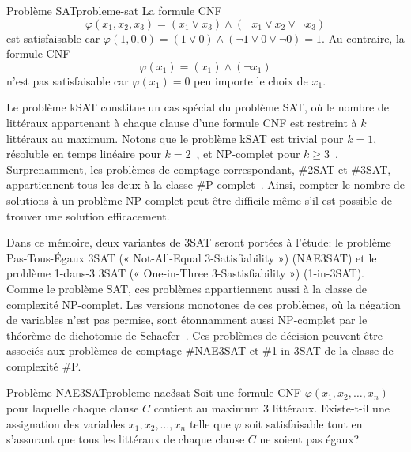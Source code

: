 \begin{example}{Problème SAT}{probleme-sat}
    La formule CNF
    \begin{equation*}
        \varphi(x_{1}, x_{2}, x_{3}) = (x_{1} \lor x_{3}) \land (\neg x_{1} \lor x_{2} \lor \neg x_{3}) 
    \end{equation*}
    est satisfaisable car $\varphi(1,0,0) = (1 \lor 0) \land (\neg 1 \lor 0 \lor \neg 0) = 1$. Au contraire, la formule CNF
    \begin{equation*}
        \varphi(x_{1})= (x_{1}) \land (\neg x_{1})
    \end{equation*}
    n'est pas satisfaisable car $\varphi (x_{1}) = 0$ peu importe le choix de $x_{1}$.
\end{example}


Le problème kSAT constitue un cas spécial du problème SAT, où le nombre de littéraux appartenant à chaque clause d'une formule CNF est restreint à $k$ littéraux au maximum. Notons que le problème kSAT est trivial pour $k=1$, résoluble en temps linéaire pour $k=2$~\cite{kromDecisionProblemClass1967}, et \textsf{NP}-complet pour $k \geq 3$~\cite{karpReducibilityCombinatorialProblems1972}. Surprenamment, les problèmes de comptage correspondant, \#2SAT et \#3SAT, appartiennent tous les deux à la classe \textsf{\#P}-complet~\cite{valiantComplexityEnumerationReliability1979}. Ainsi, compter le nombre de solutions à un problème \textsf{NP}-complet peut être difficile même s'il est possible de trouver une solution efficacement.

Dans ce mémoire, deux variantes de 3SAT seront portées à l'étude: le problème Pas-Tous-Égaux 3SAT (« Not-All-Equal 3-Satisfiability ») (NAE3SAT) et le problème 1-dans-3 3SAT (« One-in-Three 3-Sastisfiability ») (1-in-3SAT). 
Comme le problème SAT, ces problèmes appartiennent aussi à la classe de complexité \textsf{NP}-complet. Les versions monotones de ces problèmes, où la négation de variables n'est pas permise, sont étonnamment aussi \textsf{NP}-complet par le théorème de dichotomie de Schaefer~\cite{schaeferComplexitySatisfiabilityProblems1978}. Ces problèmes de décision peuvent être associés aux problèmes de comptage \#NAE3SAT et \#1-in-3SAT de la classe de complexité \textsf{\#P}.

\begin{maindefinition}{Problème NAE3SAT}{probleme-nae3sat}
    Soit une formule CNF $\varphi(x_{1}, x_{2}, \dots, x_{n})$ pour laquelle chaque clause $C$ contient au maximum 3 littéraux. Existe-t-il une assignation des variables $x_{1}, x_{2}, \dots, x_{n}$ telle que $\varphi$ soit satisfaisable tout en s'assurant que tous les littéraux de chaque clause $C$ ne soient pas égaux?
\end{maindefinition}

